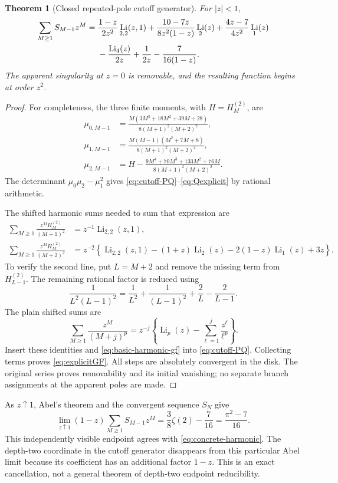 \documentclass[11pt,letterpaper]{article}
\numberwithin{equation}{section}
\newtheorem{theorem}{Theorem}[section]
\theoremstyle{definition}\newtheorem{definition}[theorem]{Definition}
\theoremstyle{remark}\newtheorem{remark}[theorem]{Remark}
\DeclareMathOperator{\Li}{Li}
\begin{document}
\begin{theorem}[Closed repeated-pole cutoff generator]\label{thm:explicitGF}
For $|z|<1$,
\begin{align}
 \sum_{M\ge1}S_{M-1}z^M
 ={}&\frac{1-z}{2z^2}\Li_{2,2}(z,1)
  +\frac{10-7z}{8z^2(1-z)}\Li_2(z)
  +\frac{4z-7}{4z^2}\Li_1(z)\notag\\
 &-\frac{\Li_4(z)}{2z}+\frac1{2z}-\frac7{16(1-z)}.
 \label{eq:explicitGF}
\end{align}
The apparent singularity at $z=0$ is removable, and the resulting
function begins at order $z^2$.
\end{theorem}
\begin{proof}
For completeness, the three finite moments, with $H=H_M^{(2)}$, are
\begin{align*}
 \mu_{0,M-1}&=\frac{M(3M^3+18M^2+39M+28)}{8(M+1)^2(M+2)^2},\\
 \mu_{1,M-1}&=\frac{M(M-1)(M^2+7M+8)}{8(M+1)^2(M+2)^2},\\
 \mu_{2,M-1}&=H-
  \frac{9M^4+70M^3+133M^2+76M}{8(M+1)^2(M+2)^2}.
\end{align*}
The determinant $\mu_0\mu_2-\mu_1^2$ gives
\eqref{eq:cutoff-PQ}--\eqref{eq:Qexplicit} by rational arithmetic.

The shifted harmonic sums needed to sum that expression are
\begin{align*}
 \sum_{M\ge1}\frac{z^M H_M^{(2)}}{(M+1)^2}
     &=z^{-1}\Li_{2,2}(z,1),\\
 \sum_{M\ge1}\frac{z^M H_M^{(2)}}{(M+2)^2}
     &=z^{-2}\left\{\Li_{2,2}(z,1)
          -(1+z)\Li_2(z)-2(1-z)\Li_1(z)+3z\right\}.
\end{align*}
To verify the second line, put $L=M+2$ and remove the missing term
from $H_{L-1}^{(2)}$. The remaining rational factor is reduced using
\[
 \frac1{L^2(L-1)^2}
 =\frac1{L^2}+\frac1{(L-1)^2}+\frac2L-\frac2{L-1}.
\]
The plain shifted sums are
\[
 \sum_{M\ge1}\frac{z^M}{(M+j)^p}
  =z^{-j}\left\{\Li_p(z)-\sum_{\ell=1}^{j}\frac{z^\ell}{\ell^p}\right\}.
\]
Insert these identities and \eqref{eq:basic-harmonic-gf} into
\eqref{eq:cutoff-PQ}. Collecting terms proves \eqref{eq:explicitGF}.
All steps are absolutely convergent in the disk. The original series
proves removability and its initial vanishing; no separate branch
assignments at the apparent poles are made.
\end{proof}

As $z\uparrow1$, Abel's theorem and the convergent sequence $S_N$ give
\begin{equation}\label{eq:AbelGF}
 \lim_{z\uparrow1}(1-z)\sum_{M\ge1}S_{M-1}z^M
     =\frac38\zeta(2)-\frac7{16}=\frac{\pi^2-7}{16}.
\end{equation}
This independently visible endpoint agrees with
\eqref{eq:concrete-harmonic}. The depth-two coordinate in the cutoff
generator disappears from this particular Abel limit because its
coefficient has an additional factor $1-z$. This is an exact cancellation,
not a general theorem of depth-two endpoint reducibility.
\end{document}
